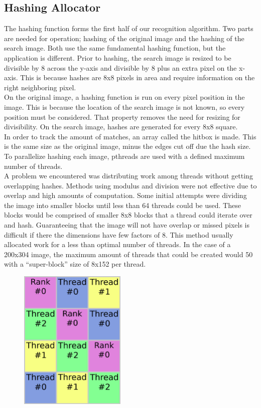 \documentclass[10pt, journal]{vgtc}                %
\newcommand\tab[1][1cm]{\hspace*{#1}}
\begin{document}
\subsection{Hashing Allocator}
\begin{flushleft}
\tab The hashing function forms the first half of our recognition algorithm. Two parts are needed for operation; hashing of the original image and the hashing of the search image. Both use the same fundamental hashing function, but the application is different. Prior to hashing, the search image is resized to be divisible by 8 across the y-axis and divisible by 8 plus an extra pixel on the x-axis. This is because hashes are 8x8 pixels in area and require information on the right neighboring pixel.\\\smallskip\tab On the original image, a hashing function is run on every pixel position in the image. This is because the location of the search image is not known, so every position must be considered. That property removes the need for resizing for divisibility. On the search image, hashes are generated for every 8x8 square.\\\smallskip
\tab In order to track the amount of matches, an array called the hitbox is made. This is the same size as the original image, minus the edges cut off due the hash size. To parallelize hashing each image, pthreads are used with a defined maximum number of threads.\\\smallskip
\tab A problem we encountered was distributing work among threads without getting overlapping hashes. Methods using modulus and division were not effective due to overlap and high amounts of computation. Some initial attempts were dividing the image into smaller blocks until less than 64 threads could be used. These blocks would be comprised of smaller 8x8 blocks that a thread could iterate over and hash. Guaranteeing that the image will not have overlap or missed pixels is difficult if there the dimensions have few factors of 8. This method usually allocated work for a less than optimal number of threads. In the case of a 200x304 image, the maximum amount of threads that could be created would 50 with a “super-block” size of 8x152 per thread.\\\smallskip
\begin{figure}[h!]
	\centering
	\includegraphics[width=2in]{thread_visualization.png}

\end{figure}
\end{flushleft}
\end{document}
